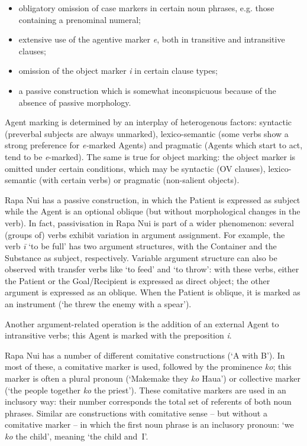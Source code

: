 \begin{itemize}
\item 
obligatory omission of case markers in certain noun phrases, e.g. those containing a prenominal numeral;

\item 
extensive use of the agentive marker \textit{e}, both in transitive and intransitive clauses;

\item 
omission of the object marker \textit{i} in certain clause types;

\item 
a passive construction which is somewhat inconspicuous because of the absence of passive morphology.

\end{itemize}

Agent marking is determined by an interplay of heterogenous factors: syntactic (preverbal subjects are always unmarked), lexico-semantic (some verbs show a strong preference for \textit{e-}marked Agents) and pragmatic (Agents which start to act, tend to be \textit{e}{}-marked). The same is true for object marking: the object marker is omitted under certain conditions, which may be syntactic (OV clauses), lexico-semantic (with certain verbs) or pragmatic (non-salient objects).

Rapa Nui has a passive construction, in which the Patient is expressed as subject while the Agent is an optional oblique (but without morphological changes in the verb). In fact, passivisation in Rapa Nui is part of a wider phenomenon: several (groups of) verbs exhibit variation in argument assignment. For example, the verb \textit{{\ꞌ}ī} ‘to be full’ has two argument structures, with the Container and the Substance as subject, respectively. Variable argument structure can also be observed with transfer verbs like ‘to feed’ and ‘to throw’: with these verbs, either the Patient or the Goal/Recipient is expressed as direct object; the other argument is expressed as an oblique. When the Patient is oblique, it is marked as an instrument (‘he threw the enemy with a spear’). 

Another argument-related operation is the addition of an external Agent to intransitive verbs; this Agent is marked with the preposition \textit{i}.

Rapa Nui has a number of different comitative constructions (‘A with B’). In most of these, a comitative marker is used, followed by the prominence \textit{ko}; this marker is often a plural pronoun (‘Makemake they \textit{ko} Haua’) or collective marker (‘the people together \textit{ko} the priest’). These comitative markers are used in an inclusory way: their number corresponds the total set of referents of both noun phrases. Similar are constructions with comitative sense – but without a comitative marker – in which the first noun phrase is an inclusory pronoun: ‘we \textit{ko} the child’, meaning ‘the child and~I’.

